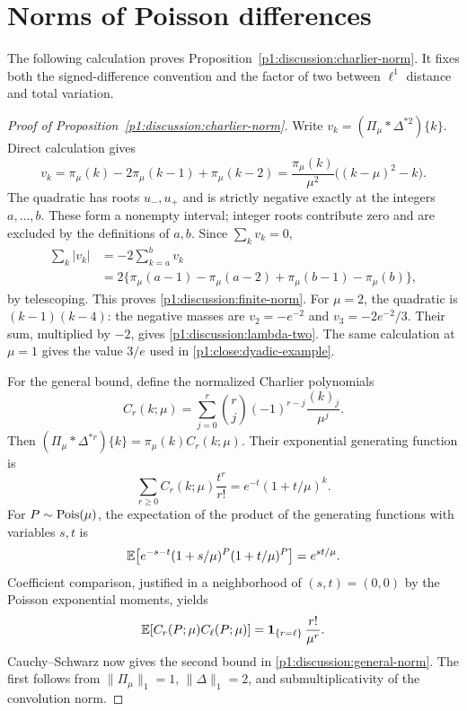 \section{Norms of Poisson differences}
\label{p14:comp:poisson-differences}

The following calculation proves Proposition~\ref{p1:discussion:charlier-norm}.
It fixes both the signed-difference convention and the factor of two between
$\ell^1$ distance and total variation.

\begin{proof}[Proof of Proposition~\ref{p1:discussion:charlier-norm}]
Write $v_k=(\Pi_\mu*\Delta^{*2})\{k\}$.  Direct calculation gives
\[
 v_k=\pi_\mu(k)-2\pi_\mu(k-1)+\pi_\mu(k-2)
     =\frac{\pi_\mu(k)}{\mu^2}\bigl((k-\mu)^2-k\bigr).
\]
The quadratic has roots $u_-,u_+$ and is strictly negative
exactly at the integers $a,\ldots,b$.  These form a nonempty
interval; integer roots contribute zero and are excluded by
the definitions of $a,b$.  Since $\sum_kv_k=0$,
\[
 \begin{aligned}
 \sum_k|v_k|
   &=-2\sum_{k=a}^b v_k\\
   &=2\bigl\{\pi_\mu(a-1)-\pi_\mu(a-2)
                 +\pi_\mu(b-1)-\pi_\mu(b)\bigr\},
 \end{aligned}
\]
by telescoping.  This proves \eqref{p1:discussion:finite-norm}.
For $\mu=2$, the quadratic is $(k-1)(k-4)$: the negative
masses are $v_2=-e^{-2}$ and $v_3=-2e^{-2}/3$.
Their sum, multiplied by $-2$, gives
\eqref{p1:discussion:lambda-two}.  The same calculation at
$\mu=1$ gives the value $3/e$ used in
\eqref{p1:close:dyadic-example}.

For the general bound, define the normalized Charlier polynomials
\[
 C_r(k;\mu)=\sum_{j=0}^r
       \binom rj(-1)^{r-j}\frac{(k)_j}{\mu^j}.
\]
Then $(\Pi_\mu*\Delta^{*r})\{k\}=\pi_\mu(k)C_r(k;\mu)$.
Their exponential generating function is
\[
 \sum_{r\ge0}C_r(k;\mu)\frac{t^r}{r!}
       =e^{-t}(1+t/\mu)^k.
\]
For $P\sim\operatorname{Pois}(\mu)$, the expectation of the product of
the generating functions with variables $s,t$ is
\[
 \mathbb E\!\left[e^{-s-t}(1+s/\mu)^P(1+t/\mu)^P\right]
       =e^{st/\mu}.
\]
Coefficient comparison, justified in a neighborhood of
$(s,t)=(0,0)$ by the Poisson exponential moments, yields
\[
 \mathbb E[C_r(P;\mu)C_\ell(P;\mu)]
       =\mathbf 1_{\{r=\ell\}}\,\frac{r!}{\mu^r}.
\]
Cauchy--Schwarz now gives the second bound in
\eqref{p1:discussion:general-norm}.  The first follows from
$\|\Pi_\mu\|_1=1$, $\|\Delta\|_1=2$, and submultiplicativity
of the convolution norm.
\end{proof}
